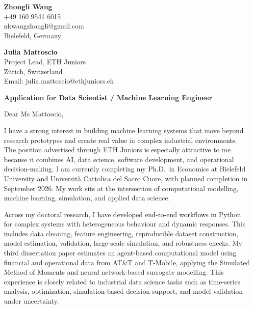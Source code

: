 \documentclass[11pt]{article}
\begin{document}
\begin{flushright}
\textbf{Zhongli Wang} \\
+49 160 9541 6015 \\
nkwangzhongli@gmail.com \\
Bielefeld, Germany \\
\end{flushright}

\vspace{0.1cm}

\noindent
\textbf{Julia Mattoscio} \\
Project Lead, ETH Juniors \\
Z\"urich, Switzerland \\
Email: julia.mattoscio@ethjuniors.ch \\

\vspace{0.1cm}

\noindent
\textbf{Application for Data Scientist / Machine Learning Engineer} \\

\vspace{0.05cm}

\noindent Dear Ms Mattoscio,

I have a strong interest in building machine learning systems that move beyond research prototypes and create real value in complex industrial environments. The position advertised through ETH Juniors is especially attractive to me because it combines AI, data science, software development, and operational decision-making. I am currently completing my Ph.D.\ in Economics at Bielefeld University and Universit\`a Cattolica del Sacro Cuore, with planned completion in September 2026. My work sits at the intersection of computational modelling, machine learning, simulation, and applied data science.

Across my doctoral research, I have developed end-to-end workflows in Python for complex systems with heterogeneous behaviour and dynamic responses. This includes data cleaning, feature engineering, reproducible dataset construction, model estimation, validation, large-scale simulation, and robustness checks. My third dissertation paper estimates an agent-based computational model using financial and operational data from AT\&T and T-Mobile, applying the Simulated Method of Moments and neural network-based surrogate modelling. This experience is closely related to industrial data science tasks such as time-series analysis, optimization, simulation-based decision support, and model validation under uncertainty.
\end{document}
